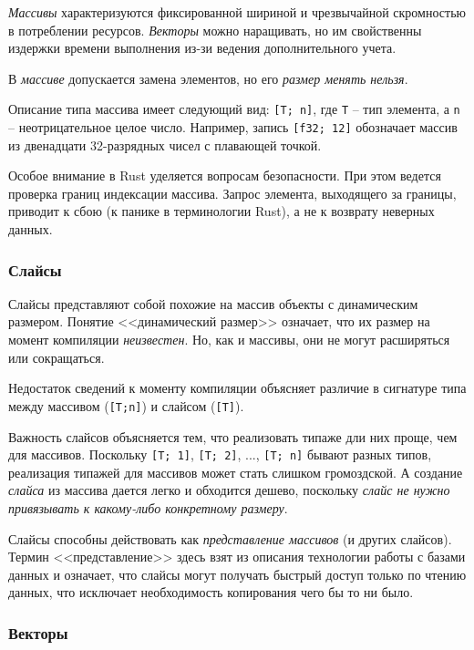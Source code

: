 \documentclass[%
	11pt,
	a4paper,
	utf8,
		]{article}
\begin{document}
\emph{Массивы} характеризуются фиксированной шириной и чрезвычайной скромностью в потреблении ресурсов. \emph{Векторы} можно наращивать, но им свойственны издержки времени выполнения из-зи ведения дополнительного учета. 

В \emph{массиве} допускается замена элементов, но его \emph{\color{red}размер менять нельзя}.

Описание типа массива имеет следующий вид: \verb|[T; n]|, где \texttt{T} -- тип элемента, а \texttt{n} -- неотрицательное целое число. Например, запись \verb|[f32; 12]| обозначает массив из двенадцати 32-разрядных чисел с плавающей точкой. 

Особое внимание в Rust уделяется вопросам безопасности. При этом ведется проверка границ индексации массива. Запрос элемента, выходящего за границы, приводит к сбою (к панике в терминологии Rust), а не к возврату неверных данных.

\subsubsection{Слайсы}

Слайсы представляют собой похожие на массив объекты с динамическим размером. Понятие <<динамический размер>> означает, что их размер на момент компиляции \emph{неизвестен}. Но, как и массивы, они не могут расширяться или сокращаться.

Недостаток сведений к моменту компиляции объясняет различие в сигнатуре типа между массивом (\verb|[T;n]|) и слайсом (\verb|[T]|).

Важность слайсов объясняется тем, что реализовать типаже дли них проще, чем для массивов. Поскольку \verb|[T; 1]|, \verb|[T; 2]|, ..., \verb|[T; n]| бывают разных типов, реализация типажей для массивов может стать слишком громоздской. А создание \emph{слайса} из массива дается легко и обходится дешево, поскольку \emph{слайс не нужно привязывать к какому-либо конкретному размеру}.

Слайсы способны действовать как \emph{представление массивов} (и других слайсов). Термин <<представление>> здесь взят из описания технологии работы с базами данных и означает, что слайсы могут получать быстрый доступ только по чтению данных, что исключает необходимость копирования чего бы то ни было.

\subsubsection{Векторы}
\end{document}
